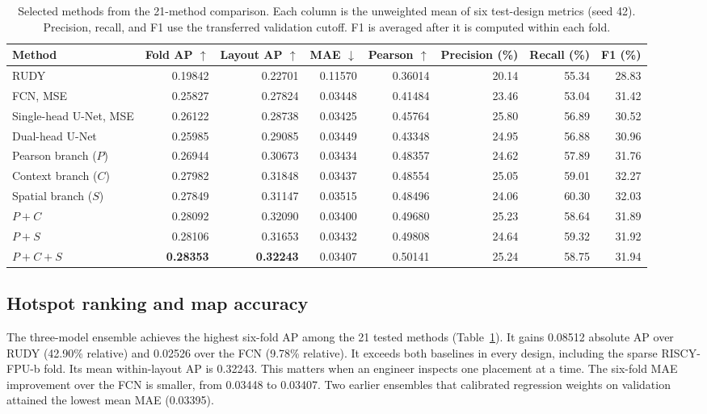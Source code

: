 \IfFileExists{./ieeeconf.cls}{\documentclass[9pt]{ieeeconf}}{\documentclass[conference]{IEEEtran}\usepackage[T1]{fontenc}}
\begin{document}
\begin{table}[t]
\centering
\caption{Selected methods from the 21-method comparison. Each column is the unweighted mean of six test-design metrics (seed 42). Precision, recall, and F1 use the transferred validation cutoff. F1 is averaged after it is computed within each fold.}
\label{tab:main}
\begin{tabular}{lrrrrrrr}
\toprule
Method & Fold AP $\uparrow$ & Layout AP $\uparrow$ & MAE $\downarrow$ & Pearson $\uparrow$ & Precision (\%) & Recall (\%) & F1 (\%) \\
\midrule
RUDY & 0.19842 & 0.22701 & 0.11570 & 0.36014 & 20.14 & 55.34 & 28.83 \\
FCN, MSE & 0.25827 & 0.27824 & 0.03448 & 0.41484 & 23.46 & 53.04 & 31.42 \\
Single-head U-Net, MSE & 0.26122 & 0.28738 & 0.03425 & 0.45764 & 25.80 & 56.89 & 30.52 \\
Dual-head U-Net & 0.25985 & 0.29085 & 0.03449 & 0.43348 & 24.95 & 56.88 & 30.96 \\
Pearson branch ($P$) & 0.26944 & 0.30673 & 0.03434 & 0.48357 & 24.62 & 57.89 & 31.76 \\
Context branch ($C$) & 0.27982 & 0.31848 & 0.03437 & 0.48554 & 25.05 & 59.01 & 32.27 \\
Spatial branch ($S$) & 0.27849 & 0.31147 & 0.03515 & 0.48496 & 24.06 & 60.30 & 32.03 \\
$P+C$ & 0.28092 & 0.32090 & 0.03400 & 0.49680 & 25.23 & 58.64 & 31.89 \\
$P+S$ & 0.28106 & 0.31653 & 0.03432 & 0.49808 & 24.64 & 59.32 & 31.92 \\
$P+C+S$ & \textbf{0.28353} & \textbf{0.32243} & 0.03407 & 0.50141 & 25.24 & 58.75 & 31.94 \\
\bottomrule
\end{tabular}
\end{table}

\subsection{Hotspot ranking and map accuracy}
The three-model ensemble achieves the highest six-fold AP among the 21 tested methods (Table~\ref{tab:main}). It gains 0.08512 absolute AP over RUDY (42.90\% relative) and 0.02526 over the FCN (9.78\% relative). It exceeds both baselines in every design, including the sparse RISCY-FPU-b fold. Its mean within-layout AP is 0.32243. This matters when an engineer inspects one placement at a time. The six-fold MAE improvement over the FCN is smaller, from 0.03448 to 0.03407. Two earlier ensembles that calibrated regression weights on validation attained the lowest mean MAE (0.03395).
\end{document}
